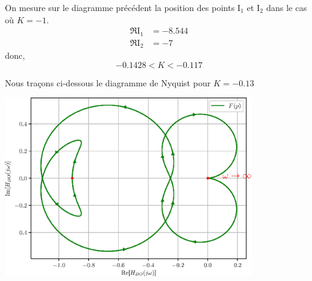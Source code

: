 On mesure sur le diagramme précédent la position des points I$_1$ et I$_2$ 
dans le cas où $K=-1$.
\begin{align*}
    \Re{\mathrm{I}_1}&=-8.544\\
    \Re{\mathrm{I}_2}&=-7
\end{align*}
donc,
\[
-0.1428<K<-0.117
\]

Nous traçons ci-dessous le diagramme de Nyquist pour $K=-0.13$
\begin{center}
\includegraphics[width=0.8\textwidth]
{fig/exercice_nyquist_chap_stab_ex1_corrige.eps}
\end{center}


